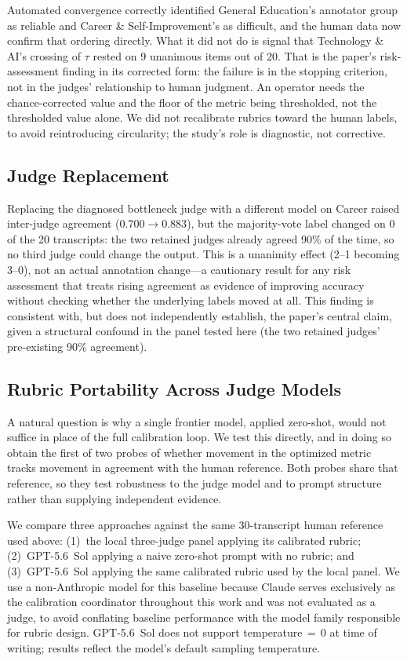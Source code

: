 \documentclass[letterpaper]{article}
\begin{document}
Automated convergence correctly identified General Education's annotator group
as reliable and Career \& Self-Improvement's as difficult, and the human data
now confirm that ordering directly. What it did not do is signal that
Technology \& AI's crossing of $\tau$ rested on 9 unanimous items out of 20.
That is the paper's risk-assessment finding in its corrected form: the failure
is in the stopping criterion, not in the judges' relationship to human
judgment. An operator needs the chance-corrected value and the floor of the
metric being thresholded, not the thresholded value alone. We did not
recalibrate rubrics toward the human labels, to avoid reintroducing
circularity; the study's role is diagnostic, not corrective.

\subsection{Judge Replacement}

Replacing the diagnosed bottleneck judge with a different model on Career
raised inter-judge agreement ($0.700 \rightarrow 0.883$), but the
majority-vote label changed on 0 of the 20 transcripts: the two retained
judges already agreed 90\% of the time, so no third judge could change the
output. This is a unanimity effect (2--1 becoming 3--0), not an actual
annotation change---a cautionary result for any risk assessment that treats
rising agreement as evidence of improving accuracy without checking whether
the underlying labels moved at all. This finding is consistent with, but does
not independently establish, the paper's central claim, given a structural
confound in the panel tested here (the two retained judges' pre-existing
90\% agreement).

\subsection{Rubric Portability Across Judge Models}
\label{sec:portability}

A natural question is why a single frontier model, applied zero-shot, would
not suffice in place of the full calibration loop. We test this
directly, and in doing so obtain the first of two probes of whether movement
in the optimized metric tracks movement in agreement with the human
reference. Both probes share that reference, so they test robustness to the
judge model and to prompt structure rather than supplying independent
evidence.

We compare three approaches against the same 30-transcript human reference
used above: (1)~the local three-judge panel applying its calibrated rubric;
(2)~GPT-5.6~Sol \citep{openai2026gpt56sol} applying a naive zero-shot prompt
with no rubric; and (3)~GPT-5.6~Sol applying the same calibrated rubric used
by the local panel. We use a non-Anthropic model for this baseline because
Claude serves exclusively as the calibration coordinator throughout this work
and was not evaluated as a judge, to avoid conflating baseline performance
with the model family responsible for rubric design. GPT-5.6~Sol does not
support temperature\,$=$\,0 at time of writing; results reflect the model's
default sampling temperature.
\end{document}
